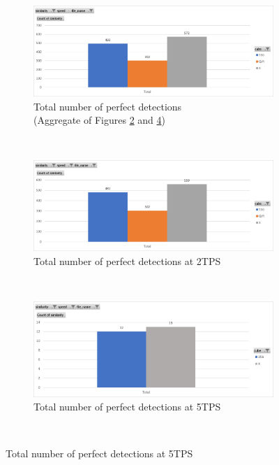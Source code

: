 \begin{figure}
\caption{Perfect Detections by Cube}
\label{fig:perfect-detections-by-cube}
\begin{subfigure}{\textwidth}
    \centering
    \caption{Total number of perfect detections \\ (Aggregate of Figures \ref{fig:perfect-detections-by-cube-2tps} and \ref{fig:perfect-detections-by-cube-5tps})}
    \label{fig:perfect-detections-by-cube-total}
    \includegraphics[width=\linewidth]{Figures/7 Evaluation/perfect_detections_by_cube.png}
    \vspace*{.1mm}
\end{subfigure}\\
\begin{subfigure}{\textwidth}
    \centering
    \caption{Total number of perfect detections at 2TPS}
    \label{fig:perfect-detections-by-cube-2tps}
    \includegraphics[width=\linewidth]{Figures/7 Evaluation/perfect_detections_by_cube_2tps.png}
    \vspace*{.1mm}
\end{subfigure}\\
\begin{subfigure}{\textwidth}
    \centering
    \caption{Total number of perfect detections at 5TPS}
    \label{fig:perfect-detections-by-cube-5tps}
    \includegraphics[width=\linewidth]{Figures/7 Evaluation/perfect_detections_by_cube_5tps.png}
    \vspace*{.1mm}
\end{subfigure}\\
\end{figure}

